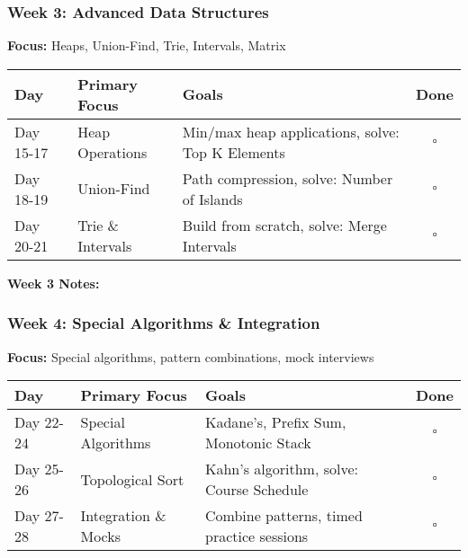 \documentclass[10pt,a4paper]{article}
\begin{document}
\subsubsection{Week 3: Advanced Data Structures}
\textbf{Focus:} Heaps, Union-Find, Trie, Intervals, Matrix

\begin{table}[h]
\centering
\begin{tabular}{|p{2cm}|p{4cm}|p{6cm}|c|}
\hline
\textbf{Day} & \textbf{Primary Focus} & \textbf{Goals} & \textbf{Done} \\
\hline
Day 15-17 & Heap Operations & Min/max heap applications, solve: Top K Elements & $\square$ \\
\hline
Day 18-19 & Union-Find & Path compression, solve: Number of Islands & $\square$ \\
\hline
Day 20-21 & Trie \& Intervals & Build from scratch, solve: Merge Intervals & $\square$ \\
\hline
\end{tabular}
\end{table}

\textbf{Week 3 Notes:}\\

\subsubsection{Week 4: Special Algorithms \& Integration}
\textbf{Focus:} Special algorithms, pattern combinations, mock interviews

\begin{table}[h]
\centering
\begin{tabular}{|p{2cm}|p{4cm}|p{6cm}|c|}
\hline
\textbf{Day} & \textbf{Primary Focus} & \textbf{Goals} & \textbf{Done} \\
\hline
Day 22-24 & Special Algorithms & Kadane's, Prefix Sum, Monotonic Stack & $\square$ \\
\hline
Day 25-26 & Topological Sort & Kahn's algorithm, solve: Course Schedule & $\square$ \\
\hline
Day 27-28 & Integration \& Mocks & Combine patterns, timed practice sessions & $\square$ \\
\hline
\end{tabular}
\end{table}
\end{document}
